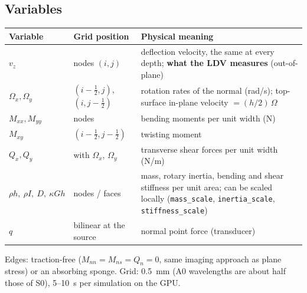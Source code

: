 \documentclass[11pt,a4paper]{article}
\newcommand{\code}[1]{\texttt{\footnotesize #1}}
\begin{document}
\subsection{Variables}
\begin{table}[h]
\centering\small
\begin{tabularx}{\textwidth}{@{}llL@{}}
\toprule
Variable & Grid position & Physical meaning \\
\midrule
$v_z$ & nodes $(i,j)$ & deflection velocity, the same at every depth; \textbf{what the LDV measures} (out-of-plane) \\
$\Omega_x, \Omega_y$ & $(i-\tfrac12, j)$, $(i, j-\tfrac12)$ & rotation rates of the normal (rad/s); top-surface in-plane velocity $= (h/2)\,\Omega$ \\
$M_{xx}, M_{yy}$ & nodes & bending moments per unit width (N) \\
$M_{xy}$ & $(i-\tfrac12, j-\tfrac12)$ & twisting moment \\
$Q_x, Q_y$ & with $\Omega_x$, $\Omega_y$ & transverse shear forces per unit width (N/m) \\
$\rho h,\ \rho I,\ D,\ \kappa G h$ & nodes / faces & mass, rotary inertia, bending and shear stiffness per unit area; can be scaled locally (\code{mass\_scale}, \code{inertia\_scale}, \code{stiffness\_scale}) \\
$q$ & bilinear at the source & normal point force (transducer) \\
\bottomrule
\end{tabularx}
\end{table}
Edges: traction-free ($M_{nn} = M_{ns} = Q_n = 0$, same imaging approach as plane stress) or an absorbing sponge.
Grid: 0.5~mm (A0 wavelengths are about half those of S0), 5--10~s per simulation on the GPU.
\end{document}
